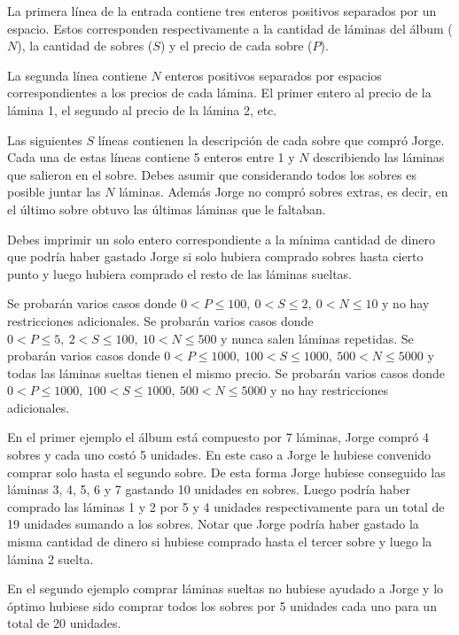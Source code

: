 \documentclass{oci}
\begin{document}
\begin{inputDescription}
La primera línea de la entrada contiene tres enteros positivos separados por un espacio.
Estos corresponden respectivamente a la cantidad de láminas del álbum ($N$), la cantidad de sobres ($S$) y el precio de cada sobre ($P$).

La segunda línea contiene $N$ enteros positivos separados por espacios correspondientes a los precios de cada lámina.
El primer entero al precio de la lámina 1, el segundo al precio de la lámina 2, etc.

Las siguientes $S$ líneas contienen la descripción de cada sobre que compró Jorge.
Cada una de estas líneas contiene 5 enteros entre 1 y $N$ describiendo las láminas que salieron en el sobre.
Debes asumir que considerando todos los sobres es posible juntar las $N$ láminas. 
Además Jorge no compró sobres extras, es decir, en el último sobre obtuvo las últimas láminas que le faltaban.
\end{inputDescription}

\begin{outputDescription}
Debes imprimir un solo entero correspondiente a la mínima cantidad de dinero que podría haber gastado Jorge si solo hubiera comprado sobres hasta cierto punto y luego hubiera comprado el resto de las láminas sueltas.
\end{outputDescription}

\begin{scoreDescription}
   Se probarán varios casos donde
 $0 < P \leq 100,\ 0 < S \leq 2,\ 0 < N \leq 10$ y no hay restricciones adicionales.
   Se probarán varios casos donde
 $0<P\leq 5,\ 2 < S \leq 100,\ 10 < N \leq 500$ y nunca salen láminas repetidas.
   Se probarán varios casos donde
$0<P\leq 1000,\ 100 < S \leq 1000,\ 500 < N \leq 5000$ y todas las láminas sueltas tienen el mismo precio.
   Se probarán varios casos donde
$0<P\leq 1000,\ 100 < S \leq 1000,\ 500<N\leq 5000$
y no hay restricciones adicionales.
\end{scoreDescription}

\begin{sampleDescription}

En el primer ejemplo el álbum está compuesto por 7 láminas, Jorge compró 4 sobres y cada uno costó 5 unidades.
En este caso a Jorge le hubiese convenido comprar solo hasta el segundo sobre.
De esta forma Jorge hubiese conseguido las láminas 3, 4, 5, 6 y 7 gastando 10 unidades en sobres.
Luego podría haber comprado las láminas 1 y 2 por 5 y 4 unidades respectivamente para un total de 19 unidades sumando a los sobres.
Notar que Jorge podría haber gastado la misma cantidad de dinero si hubiese comprado hasta el tercer sobre y luego la lámina 2 suelta.

En el segundo ejemplo comprar láminas sueltas no hubiese ayudado a Jorge y lo óptimo hubiese sido comprar todos los sobres por 5 unidades cada uno para un total de 20 unidades.

\end{sampleDescription}
\end{document}

